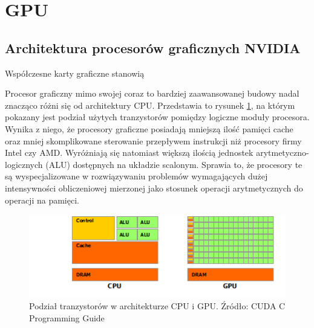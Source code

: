 \section{GPU}
\subsection{Architektura procesorów graficznych NVIDIA}

Współczesne karty graficzne stanowią 

Procesor graficzny mimo swojej coraz to bardziej zaawansowanej budowy nadal
znacząco różni się od architektury CPU. Przedstawia to rysunek \ref{cpugpu}, na
którym pokazany jest podział użytych tranzystorów pomiędzy logiczne moduły procesora.
Wynika z niego, że procesory graficzne posiadają mniejszą ilość pamięci cache oraz
mniej skomplikowane sterowanie przepływem instrukcji niż procesory firmy
Intel czy AMD. Wyróżniają się natomiast większą ilością jednostek arytmetyczno-logicznych
(ALU) dostępnych na układzie scalonym. Sprawia to, że procesory te są wyspecjalizowane w rozwiązywaniu
problemów wymagających dużej intensywności obliczeniowej mierzonej jako stosunek
operacji arytmetycznych do operacji na pamięci.

\begin{figure}[H]
\centering
\includegraphics{images/gpu-devotes-more-transistors-to-data-processing.png}
\caption{Podział tranzystorów w architekturze CPU i GPU. Źródło: CUDA C Programming Guide}
\label{cpugpu}
\end{figure}

